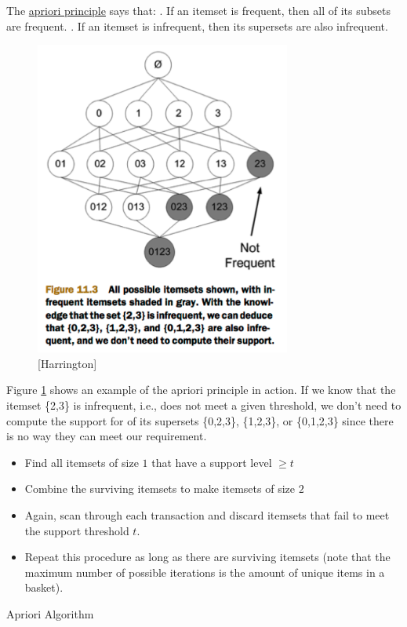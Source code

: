 \documentclass[a4paper]{article}
\begin{document}
\begin{definition}
The \underline{apriori principle} says that: . If an itemset is frequent, then all of its subsets are frequent.  
. If an itemset is infrequent, then its supersets are also infrequent.  
\end{definition}

\begin{figure}
\centering
\includegraphics[width=0.75\textwidth]{TrimmedItemsetHierarchy.png}
\caption{\label{fig:trimmedItemsets} [Harrington]}
\end{figure}

Figure \ref{fig:trimmedItemsets} shows an example of the apriori principle in action. If we know that the itemset \{2,3\} is infrequent, i.e., does not meet a given threshold, we don't need to compute the support for of its supersets \{0,2,3\}, \{1,2,3\}, or \{0,1,2,3\} since there is no way they can meet our requirement.

\begin{algorithm}
 
  \begin{itemize}
  \item Find all itemsets of size $1$ that have a support level $\geq t$
  \item Combine the surviving itemsets to make itemsets of size $2$
  \item Again, scan through each transaction and discard itemsets that fail to meet the support threshold $t$.
  \item Repeat this procedure as long as there are surviving itemsets (note that the maximum number of possible iterations is the amount of unique items in a basket).
  \end{itemize}
 \caption{Apriori Algorithm}
 \label{alg:apriori}
\end{algorithm}
\end{document}
